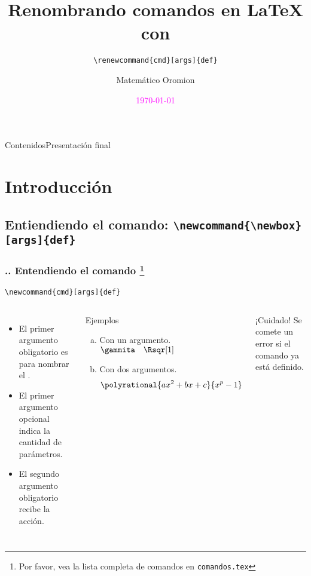 \documentclass[12pt]{beamer}
\begin{document}
\author{Matemático Oromion}
\title{\Large Renombrando comandos en \LaTeX{} con}
\cprotect\subtitle{\verb|\renewcommand{cmd}[args]{def}|}
\date{\textcolor{magenta}{\today}}
\subject{Fin del curso}

\begin{frame}[plain]
	\maketitle
\end{frame}

\begin{frame}{Contenidos}{Presentación final}
\tableofcontents
\end{frame}

\section{Introducción}
\cprotect\subsection{Entiendiendo el comando: \verb!\newcommand{\newbox}[args]{def}!}

\begin{frame}[fragile]
\frametitle{\thesection.\thesubsection. Entendiendo el comando  \footnote{Por favor, vea la lista completa de comandos en \texttt{comandos.tex} }}
\centering
\verb|\newcommand{cmd}[args]{def}|

\begin{columns}


\begin{itemize}
	\item El primer argumento obligatorio es para nombrar el .
	\item El primer argumento opcional indica la cantidad de parámetros.
	\item El segundo argumento obligatorio recibe la acción.
\end{itemize}
\begin{block}{Ejemplos}
\begin{enumerate}[a)]
\item Con un argumento.
$\gammita\quad\Rsqr[1]$
\item Con dos argumentos.
\[\polyrational{ax^{2}+bx+c}{x^{p}-1}\]
\end{enumerate}
\end{block}

\begin{alertblock}{¡Cuidado!}
Se comete un error si el comando ya está definido.
\end{alertblock}
\end{columns}

\end{frame}
\end{document}
